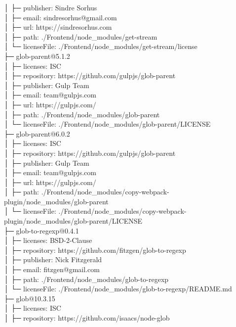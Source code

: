 \documentclass[
    paper=a4,
    twoside=false,
    parskip=half,
    listof=entryprefix,
    listof=totoc,
    index=totoc,
    bibliography=totoc,
    headsepline,
]{scrbook}
\begin{document}
    │  ├─ publisher: Sindre Sorhus\\
    │  ├─ email: sindresorhus@gmail.com\\
    │  ├─ url: https://sindresorhus.com\\
    │  ├─ path: ./Frontend/node\_modules/get-stream\\
    │  └─ licenseFile: ./Frontend/node\_modules/get-stream/license\\
    ├─ glob-parent@5.1.2\\
    │  ├─ licenses: ISC\\
    │  ├─ repository: https://github.com/gulpjs/glob-parent\\
    │  ├─ publisher: Gulp Team\\
    │  ├─ email: team@gulpjs.com\\
    │  ├─ url: https://gulpjs.com/\\
    │  ├─ path: ./Frontend/node\_modules/glob-parent\\
    │  └─ licenseFile: ./Frontend/node\_modules/glob-parent/LICENSE\\
    ├─ glob-parent@6.0.2\\
    │  ├─ licenses: ISC\\
    │  ├─ repository: https://github.com/gulpjs/glob-parent\\
    │  ├─ publisher: Gulp Team\\
    │  ├─ email: team@gulpjs.com\\
    │  ├─ url: https://gulpjs.com/\\
    │  ├─ path: ./Frontend/node\_modules/copy-webpack-plugin/node\_modules/glob-parent\\
    │  └─ licenseFile: ./Frontend/node\_modules/copy-webpack-plugin/node\_modules/glob-parent/LICENSE\\
    ├─ glob-to-regexp@0.4.1\\
    │  ├─ licenses: BSD-2-Clause\\
    │  ├─ repository: https://github.com/fitzgen/glob-to-regexp\\
    │  ├─ publisher: Nick Fitzgerald\\
    │  ├─ email: fitzgen@gmail.com\\
    │  ├─ path: ./Frontend/node\_modules/glob-to-regexp\\
    │  └─ licenseFile: ./Frontend/node\_modules/glob-to-regexp/README.md\\
    ├─ glob@10.3.15\\
    │  ├─ licenses: ISC\\
    │  ├─ repository: https://github.com/isaacs/node-glob\\
\end{document}
